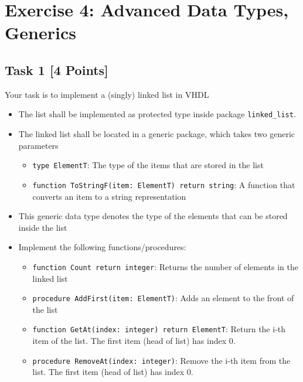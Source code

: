 \documentclass[12pt,epsf,makeidx,oneside]{book}
\begin{document}
\section{Exercise 4: Advanced Data Types, Generics}
  \subsection{Task 1 [4 Points]}
  Your task is to implement a (singly) linked list in VHDL
  \begin{itemize}[noitemsep]
    \item The list shall be implemented as protected type inside package {\tt linked\_list}.
    \item The linked list shall be located in a generic package, which takes two generic parameters
    \begin{itemize}[noitemsep]
      \item {\tt type ElementT}: The type of the items that are stored in the list
      \item {\tt function ToStringF(item: ElementT) return string}: A function that converts an item to a string representation
    \end{itemize}
    \item This generic data type denotes the type of the elements that can be stored inside the list
    \item Implement the following functions/procedures:
    \begin{itemize}[noitemsep]
      \item {\tt function Count return integer}: Returns the number of elements in the linked list
      \item {\tt procedure AddFirst(item: ElementT)}: Adds an element to the front of the list
      \item {\tt function GetAt(index: integer) return ElementT}: Return the i-th item of the list. The first item (head of list) has index 0.
      \item {\tt procedure RemoveAt(index: integer)}: Remove the i-th item from the list. The first item (head of list) has index 0.

\end{itemize}
\end{itemize}
\end{document}
